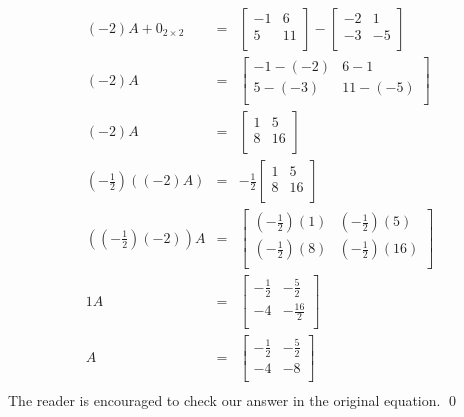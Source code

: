 \documentclass{ximera}
\begin{document}
\begin{example}
\[\begin{array}{rcl}
(-2)A+ 0_{2 \times 2} & = & \left[ \begin{array}{rr} -1 & 6 \\ 5 & 11 \\ \end{array}\right] -\left[ \begin{array}{rr} -2 & 1 \\ -3 & -5 \\ \end{array}\right] \\  



(-2)A & = & \left[ \begin{array}{rr} -1 - (-2) & 6 - 1 \\ 5 - (-3) & 11 - (-5) \\ \end{array}\right] \\  

(-2)A & = & \left[ \begin{array}{rr} 1 & 5 \\ 8 & 16 \\ \end{array}\right] \\  

\left(-\frac{1}{2}\right)\left((-2)A\right) & = & -\frac{1}{2} \left[ \begin{array}{rr} 1 & 5 \\ 8 & 16 \\ \end{array}\right] \\  

\left(\left(-\frac{1}{2}\right)(-2)\right)A & =  &  \left[ \begin{array}{rr} \left(-\frac{1}{2}\right)(1) & \left(-\frac{1}{2}\right)(5) \\[2pt] \left(-\frac{1}{2}\right)(8) & \left(-\frac{1}{2}\right)(16) \\ \end{array}\right] \\  

1 A & =  &  \left[ \begin{array}{rr} -\frac{1}{2} & -\frac{5}{2} \\[2pt] -4 & -\frac{16}{2} \\ \end{array}\right] \\  

A & =  &  \left[ \begin{array}{rr} -\frac{1}{2} & -\frac{5}{2} \\[2pt] -4 & -8 \\ \end{array}\right] \\  

\end{array} \]
The reader is encouraged to check our answer in the original equation.  \qed
\end{example}
\end{document}
